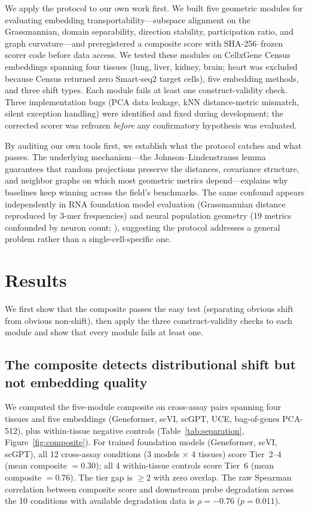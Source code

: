 \documentclass[10pt,letterpaper]{article}
\begin{document}
We apply the protocol to our own work first. We built five geometric modules for evaluating embedding transportability---subspace alignment on the Grassmannian, domain separability, direction stability, participation ratio, and graph curvature---and preregistered a composite score with SHA-256--frozen scorer code before data access. We tested these modules on CellxGene Census embeddings spanning four tissues (lung, liver, kidney, brain; heart was excluded because Census returned zero Smart-seq2 target cells), five embedding methods, and three shift types. Each module fails at least one construct-validity check. Three implementation bugs (PCA data leakage, kNN distance-metric mismatch, silent exception handling) were identified and fixed during development; the corrected scorer was refrozen \emph{before} any confirmatory hypothesis was evaluated.

By auditing our own tools first, we establish what the protocol catches and what passes. The underlying mechanism---the Johnson--Lindenstrauss lemma guarantees that random projections preserve the distances, covariance structure, and neighbor graphs on which most geometric metrics depend---explains why baselines keep winning across the field's benchmarks. The same confound appears independently in RNA foundation model evaluation (Grassmannian distance reproduced by 3-mer frequencies) and neural population geometry (19 metrics confounded by neuron count; \citealp{tower2026bracket}), suggesting the protocol addresses a general problem rather than a single-cell-specific one.


\section{Results}

We first show that the composite passes the easy test (separating obvious shift from obvious non-shift), then apply the three construct-validity checks to each module and show that every module fails at least one.

\subsection{The composite detects distributional shift but not embedding quality}

We computed the five-module composite on cross-assay pairs spanning four tissues and five embeddings (Geneformer, scVI, scGPT, UCE, bag-of-genes PCA-512), plus within-tissue negative controls (Table~\ref{tab:separation}, Figure~\ref{fig:composite}). For trained foundation models (Geneformer, scVI, scGPT), all 12 cross-assay conditions (3 models $\times$ 4 tissues) score Tier~2--4 (mean composite $= 0.30$); all 4 within-tissue controls score Tier~6 (mean composite $= 0.76$). The tier gap is $\geq 2$ with zero overlap. The raw Spearman correlation between composite score and downstream probe degradation across the 10 conditions with available degradation data is $\rho = -0.76$ ($p = 0.011$).
\end{document}
